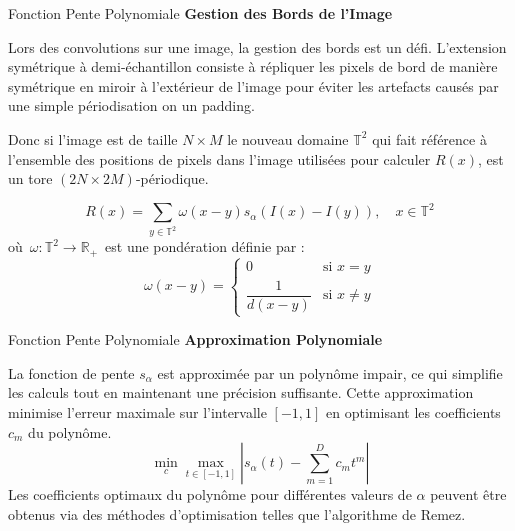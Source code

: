 \documentclass[8pt,a4paper]{beamer}
\numberwithin{figure}{section}
\begin{document}
\begin{frame}{Fonction Pente Polynomiale}
\textbf{Gestion des Bords de l'Image}
\vspace{3mm}
\par Lors des convolutions sur une image, la gestion des bords est un défi. L'extension symétrique à demi-échantillon consiste à répliquer les pixels de bord de manière symétrique en miroir à l'extérieur de l'image pour éviter les artefacts causés par une simple périodisation on un padding.
\vspace{2mm}
\par Donc si l'image est de taille $N\times M$ le nouveau domaine \( \mathbb{T}^2 \) qui fait référence à l'ensemble des positions de pixels dans l'image utilisées pour calculer \( R(x) \), est un tore $(2N\!\times\! 2M)$-périodique. 

$$
R(x) = \sum_{y \in \mathbb{T}^2} \omega(x - y)s_\alpha(I(x) - I(y)), \quad x \in \mathbb{T}^2
$$
où $\,\omega : \mathbb{T}^2 \longrightarrow \mathbb{R}_{+}\,$ est une pondération définie par :
$$
\omega(x - y) =
\begin{cases}
0 & \text{si } x = y \\
\dfrac{1}{d(x - y)} & \text{si } x \neq y
\end{cases}
$$
\end{frame}

\begin{frame}{Fonction Pente Polynomiale}
\textbf{Approximation Polynomiale}
\vspace{3mm}
\par La fonction de pente $s_\alpha$ est approximée par un polynôme impair, ce qui simplifie les calculs tout en maintenant une précision suffisante. Cette approximation minimise l'erreur maximale sur l'intervalle \([-1, 1]\) en optimisant les coefficients \( c_m \) du polynôme.
$$
\min_{c} \max_{t \in [-1, 1]} \left| s_\alpha(t) - \sum_{m=1}^{D} c_m t^m \right|
$$
Les coefficients optimaux du polynôme pour différentes valeurs de \( \alpha \) peuvent être obtenus via des méthodes d'optimisation telles que l'algorithme de Remez.
\end{frame}
\end{document}
